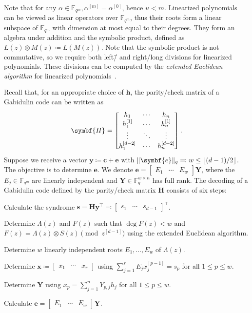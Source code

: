 \documentclass[version=last, paper=A4, parskip=half, oneside]{scrbook}
\theoremstyle{plain}
\theoremstyle{definition}
\theoremstyle{remark}
\renewcommand*{\vec}{\symbf}
\newcommand*{\mat}{\symbf}
\newcommand*{\trans}{\top}%
\newcommand*{\FF}{\ensuremath{\mathbb{F}}}
\DeclarePairedDelimiter{\floor}{\lfloor}{\rfloor}
\DeclarePairedDelimiter{\norm}{\lVert}{\rVert}
\newcommand*{\normR}[2]{\ensuremath{\norm{#1}_{#2}}}
\begin{document}
Note that for any \(\alpha \in \FF_{q^m}, \alpha^{[m]} = \alpha^{[0]}\), hence
\(u < m\).  Linearized polynomials can be viewed as linear operators over
\(\FF_{q^m}\), thus their roots form a linear subspace of \(\FF_{q^m}\) with
dimension at most equal to their degrees.  They form an algebra under addition
and the symbolic product, defined as \(L(z) \otimes M(z) \coloneqq L(M(z))\).
Note that the symbolic product is not commutative, so we require both left\=/{}
and right\-/long divisions for linearized polynomials.  These divisions can be
computed by the \emph{extended Euclidean algorithm} for linearized
polynomials~\cite{WSB10}.

Recall that, for an appropriate choice of \(\vec{h}\), the parity\-/check matrix
of a Gabidulin code can be written as
\[
  \mat{H} =
  \begin{bmatrix}
    h_1 & \cdots & h_n \\
    h_1^{[1]} & \cdots & h_n^{[1]} \\
    \vdots & \ddots & \vdots \\
    h_1^{[d - 2]} & \cdots & h_n^{[d - 2]}
  \end{bmatrix}\text.
\]
Suppose we receive a vector \(\vec{y} \coloneqq \vec{c} + \vec{e}\) with
\(\normR{\vec{e}}{q} \eqqcolon w \le \floor{(d - 1) / {2}}\).  The objective is
to determine \(\vec{e}\).  We denote
\(\vec{e} = \begin{bmatrix} E_1 & \cdots & E_w \end{bmatrix}\mat{Y}\), where the
\(E_j \in \FF_{q^m}\) are linearly independent and
\(\mat{Y} \in \FF_q^{w \times n}\) has full rank.  The decoding of a Gabidulin
code defined by the parity\-/check matrix \(\mat{H}\) consists of six steps:
\begin{steps}
\item\label{stp:GC-decoding-1} Calculate the syndrome
  \(\vec{s} = \mat{H} \vec{y}^{\trans} \eqqcolon
  \begin{bmatrix} s_1 & \cdots & s_{d - 1} \end{bmatrix}^{\trans}\).
\item\label{stp:GC-decoding-2} Determine \(\Lambda(z)\) and \(F(z)\) such that
  \(\deg F(z) < w\) and \(F(z) = \Lambda(z) \otimes S(z) \pmod{z^{[d - 1]}}\)
  using the extended Euclidean algorithm.
\item\label{stp:GC-decoding-3} Determine \(w\) linearly independent roots
  \(E_1, \ldots, E_w\) of \(\Lambda(z)\).
\item\label{stp:GC-decoding-4} Determine
  \(\vec{x} \coloneqq \begin{bmatrix} x_1 & \cdots & x_r \end{bmatrix}\) using
  \(\sum_{j = 1}^r E_j x_j^{[p - 1]} = s_p\) for all \(1 \le p \le w\).
\item\label{stp:GC-decoding-5} Determine \(\mat{Y}\) using
  \(x_p = \sum_{j = 1}^n Y_{p, j} h_j\) for all \(1 \le p \le w\).
\item\label{stp:GC-decoding-6} Calculate
  \(\vec{e} = \begin{bmatrix} E_1 & \cdots & E_w \end{bmatrix} \mat{Y}\).
\end{steps}
\end{document}
